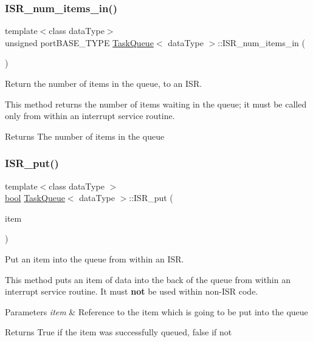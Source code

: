 \subsubsection{\texorpdfstring{I\+S\+R\+\_\+num\+\_\+items\+\_\+in()}{ISR\_num\_items\_in()}}
{\footnotesize\ttfamily template$<$class data\+Type$>$ \\
unsigned port\+B\+A\+S\+E\+\_\+\+T\+Y\+PE \mbox{\hyperlink{class_task_queue}{Task\+Queue}}$<$ data\+Type $>$\+::I\+S\+R\+\_\+num\+\_\+items\+\_\+in (\begin{DoxyParamCaption}\item[{void}]{ }\end{DoxyParamCaption})\hspace{0.3cm}{\ttfamily [inline]}}



Return the number of items in the queue, to an I\+SR. 

This method returns the number of items waiting in the queue; it must be called only from within an interrupt service routine. \begin{DoxyReturn}{Returns}
The number of items in the queue 
\end{DoxyReturn}
\mbox{\label{class_task_queue_a51ff464dfa1c2be2beae36fdd9e36b44}} 
\subsubsection{\texorpdfstring{I\+S\+R\+\_\+put()}{ISR\_put()}}
{\footnotesize\ttfamily template$<$class data\+Type $>$ \\
\mbox{\hyperlink{group___motor___boolean___type_ga0ecf26b576b9a54eca656b9be7ba6a06}{bool}} \mbox{\hyperlink{class_task_queue}{Task\+Queue}}$<$ data\+Type $>$\+::I\+S\+R\+\_\+put (\begin{DoxyParamCaption}\item[{const data\+Type \&}]{item }\end{DoxyParamCaption})\hspace{0.3cm}{\ttfamily [inline]}}



Put an item into the queue from within an I\+SR. 

This method puts an item of data into the back of the queue from within an interrupt service routine. It must {\bfseries not} be used within non-\/\+I\+SR code. 
\begin{DoxyParams}{Parameters}
{\em item} & Reference to the item which is going to be put into the queue \\
\hline
\end{DoxyParams}
\begin{DoxyReturn}{Returns}
True if the item was successfully queued, false if not 
\end{DoxyReturn}
\mbox{\label{class_task_queue_a696a695c31e089cf2361f8a16c2fefe6}} 
